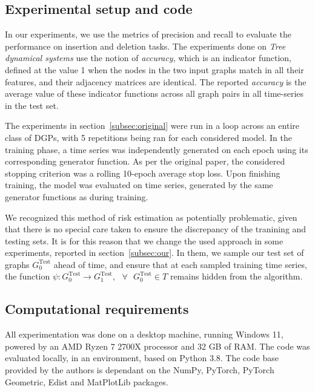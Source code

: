 \subsection{Experimental setup and code}
\label{sec:methodology}
In our experiments, we use the metrics of precision and recall to evaluate the performance on insertion and deletion tasks. The experiments done on \textit{Tree dynamical systems} use the notion of \textit{accuracy}, which is an indicator function, defined at the value 1 when the nodes in the two input graphs match in all their features, and their adjacency matrices are identical. The reported \textit{accuracy} is the average value of these indicator functions across all graph pairs in all time-series in the test set.

The experiments in section~\ref{subsec:original} were run in a loop across an entire class of DGPs, with 5 repetitions being ran for each considered model. In the training phase, a time series was independently generated on each epoch using its corresponding generator function. As per the original paper, the considered stopping criterion was a rolling 10-epoch average stop loss. Upon finishing training, the model was evaluated on time series, generated by the same generator functions as during training.

We recognized this method of risk estimation as potentially problematic, given that there is no special care taken to ensure the discrepancy of the tranining and testing sets. It is for this reason that we change the used approach in some experiments, reported in section~\ref{subsec:our}. In them, we sample our test set of graphs $G_{0}^{\text{Test}}$ ahead of time, and ensure that at each sampled training time series, the function $\psi: G_{0}^{\text{Test}} \to G_{1}^{\text{Test}},\text{  } \forall \text{  } G_{0}^{\text{Test}} \in T$ remains hidden from the algorithm.



\subsection{Computational requirements}
All experimentation was done on a desktop machine, running Windows 11, powered by an AMD Ryzen 7 2700X processor and 32 GB of RAM. The code was evaluated locally, in an environment, based on Python 3.8. The code base provided by the authors is dependant on the NumPy, PyTorch, PyTorch Geometric, Edist \cite{Edist} and MatPlotLib packages.

